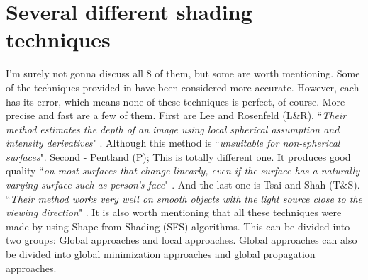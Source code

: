 \documentclass{scrartcl}
\begin{document}
\section{Several different shading techniques}
I'm surely not gonna discuss all 8 of them, but some are worth mentioning.
Some of the techniques provided in \cite{zhang1994analysis} have been considered more accurate.
However, each has its error, which means none of these techniques is perfect, of course.
More precise and fast are a few of them.
First are Lee and Rosenfeld (L\&R).
``\textit{Their method estimates the depth of an image using local spherical assumption and intensity derivatives}" \cite[p.~380]{zhang1994analysis}.
Although this method is ``\textit{unsuitable for non-spherical surfaces}".
Second - Pentland (P); This is totally different one.
It produces good quality ``\textit{on most surfaces that change linearly, even if the surface has a naturally varying surface such as person's face}" \cite[p.~380]{zhang1994analysis}.
And the last one is Tsai and Shah (T\&S).
``\textit{Their method works very well on smooth objects with the light source close to the viewing direction}" \cite[p.~381]{zhang1994analysis}.
It is also worth mentioning that all these techniques were made by using Shape from Shading (SFS) algorithms.
This can be divided into two groups: Global approaches and local approaches.
Global approaches can also be divided into global minimization approaches and global propagation approaches.
\end{document}
